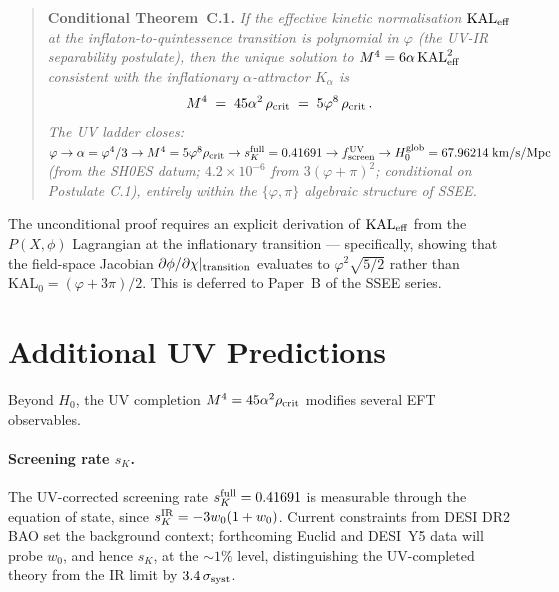 \documentclass[12pt,a4paper]{article}
\newcommand{\phiG}{\varphi}
\newcommand{\KAL}{\mathrm{KAL}_0}
\newcommand{\KALeff}{\mathrm{KAL}_{\rm eff}}
\newcommand{\fsc}{f_{\mathrm{screen}}}
\newcommand{\sK}{s_K}
\newcommand{\rhoc}{\rho_{\rm crit}}
\begin{document}
\medskip
\begin{quote}
\textbf{Conditional Theorem~C.1.}
\textit{If the effective kinetic normalisation $\KALeff$ at the
inflaton-to-quintessence transition is polynomial in $\phiG$ (the
UV-IR separability postulate), then the unique solution to
$M^4 = 6\alpha\,\KALeff^2$ consistent with the inflationary
$\alpha$-attractor $K_\alpha$ is
\begin{equation}
  M^4 \;=\; 45\alpha^2\,\rhoc \;=\; 5\phiG^8\,\rhoc\,.
  \label{eq:CT1}
\end{equation}
The UV ladder closes:
$\phiG \to \alpha = \phiG^4/3 \to M^4 = 5\phiG^8\rhoc
\to \sK^{\rm full} = 0.41691
\to \fsc^{\rm UV} \to H_0^{\rm glob} = 67.96214\;\mathrm{km/s/Mpc}$
(from the SH0ES datum; $4.2\times10^{-6}$ from $3(\phiG+\pi)^2$;
conditional on Postulate C.1),
entirely within the $\{\phiG,\pi\}$ algebraic structure of SSEE.}
\end{quote}

The unconditional proof requires an explicit derivation of $\KALeff$
from the $P(X,\phi)$ Lagrangian at the inflationary transition ---
specifically, showing that the field-space Jacobian $\partial\phi/\partial\chi|_{\rm transition}$
evaluates to $\phiG^2\sqrt{5/2}$ rather than $\KAL = (\phiG+3\pi)/2$.
This is deferred to Paper~B of the SSEE series.


\section{Additional UV Predictions}
\label{sec:predictions}

Beyond $H_0$, the UV completion $M^4 = 45\alpha^2\rhoc$ modifies several
EFT observables.

\paragraph{Screening rate $\sK$.}
The UV-corrected screening rate $\sK^{\rm full} = 0.41691$ is measurable
through the equation of state, since $\sK^{\rm IR} = -3w_0(1+w_0)$.
Current constraints from DESI DR2 BAO \citep{AbdulKarim2025} set the background
context; forthcoming Euclid and DESI~Y5 data will probe $w_0$, and hence $\sK$, at the
$\sim1\%$ level, distinguishing the UV-completed theory from the IR limit by
$3.4\,\sigma_{\rm syst}$.
\end{document}
